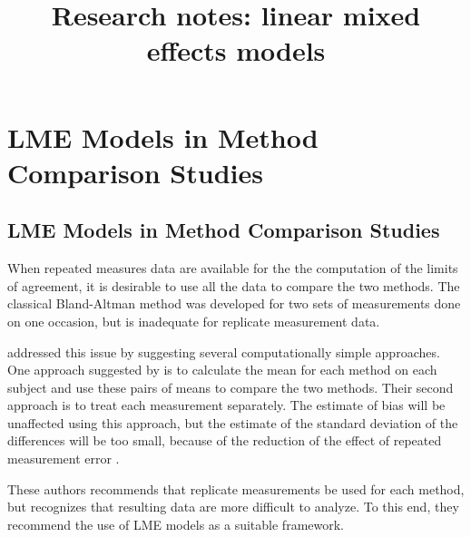 \documentclass[12pt, a4paper]{report}
\title{Research notes: linear mixed effects models}
\author{ } \date{ }
\theoremstyle{plain}
\theoremstyle{definition}
\theoremstyle{remark}
\begin{document}
\tableofcontents
\newpage
\chapter{LME Models in Method Comparison Studies}

\section{LME Models in Method Comparison Studies}

When repeated measures data are available for the the computation of the limits of agreement, it is desirable to use all the data to compare the two methods. The classical Bland-Altman method was developed for two sets of measurements done on one occasion, but is inadequate for replicate measurement data. 

\citet{BA99} addressed this issue by suggesting several computationally simple approaches.  One approach suggested by \citet{BA99} is to calculate the mean for each method on each subject and use these pairs of means to compare the two methods. Their second approach is to treat each measurement separately. 
The estimate of bias will be unaffected using this approach, but the estimate of the standard deviation of the differences will be too small, because of the reduction of the effect of repeated measurement error \citep{BXC2004,BXC2008}. 

These authors recommends that replicate measurements be used for each method, but recognizes that resulting data are more difficult to analyze. To this end, they recommend the use of LME models as a suitable framework.



\end{document}
